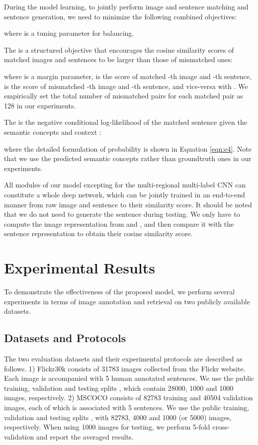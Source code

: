\documentclass[10pt,twocolumn,letterpaper]{article}
\begin{document}
During the model learning, to jointly perform image and sentence matching and sentence generation,
we need to minimize the following combined objectives:

where  is a tuning parameter for balancing.

The  is a structured objective
that encourages the cosine similarity scores of matched images and sentences to be larger
than those of mismatched ones:

where  is a margin parameter,
 is the score of matched -th image and -th sentence,
 is the score of mismatched -th image and -th sentence,
and vice-versa with .
We empirically set the total number of mismatched pairs for each matched pair
as 128 in our experiments.



The  is the negative conditional log-likelihood of
the matched sentence given the semantic concepts  and context :

where the detailed formulation of probability  is shown in Equation \ref{eqn:e4}.
Note that we use the predicted semantic concepts rather than
groundtruth ones in our experiments.

All modules of our model excepting for the multi-regional multi-label CNN
can constitute a whole deep network,
which can be jointly trained in an end-to-end manner from raw image and sentence to their similarity score.
It should be noted that we do not need to generate the sentence during testing.
We only have to compute the image representation 
from  and ,
and then compare it with the sentence representation 
to obtain their cosine similarity score.






\section{Experimental Results}
To demonstrate the effectiveness of the proposed model,
we perform several experiments in terms of image annotation
and retrieval on two publicly available datasets.

\subsection{Datasets and Protocols}

The two evaluation datasets and their experimental protocols are described as follows.
1) {Flickr30k} \cite{young2014image}
consists of 31783 images collected from the Flickr website.
Each image is accompanied with 5 human annotated sentences.
We use the public training, validation and testing splits \cite{kiros2014unifying}, which
contain 28000, 1000 and 1000 images, respectively.
2) {MSCOCO} \cite{lin2014microsoft} consists of 82783
training and 40504 validation images, each of which is associated with 5 sentences.
We use the public training, validation and testing splits \cite{kiros2014unifying},
with 82783, 4000 and 1000 (or 5000) images, respectively.
When using 1000 images for testing, we perform 5-fold cross-validation
and report the averaged results.
\end{document}
